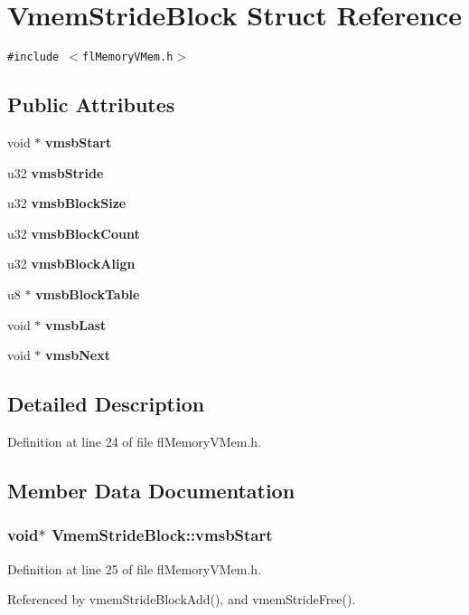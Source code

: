 \section{Vmem\-Stride\-Block Struct Reference}
\label{structVmemStrideBlock}
{\tt \#include $<$fl\-Memory\-VMem.h$>$}

\subsection*{Public Attributes}
\begin{CompactItemize}
\item 
void $\ast$ {\bf vmsb\-Start}
\item 
u32 {\bf vmsb\-Stride}
\item 
u32 {\bf vmsb\-Block\-Size}
\item 
u32 {\bf vmsb\-Block\-Count}
\item 
u32 {\bf vmsb\-Block\-Align}
\item 
u8 $\ast$ {\bf vmsb\-Block\-Table}
\item 
void $\ast$ {\bf vmsb\-Last}
\item 
void $\ast$ {\bf vmsb\-Next}
\end{CompactItemize}


\subsection{Detailed Description}




Definition at line 24 of file fl\-Memory\-VMem.h.

\subsection{Member Data Documentation}
\subsubsection{\setlength{\rightskip}{0pt plus 5cm}void$\ast$ {\bf Vmem\-Stride\-Block::vmsb\-Start}}\label{structVmemStrideBlock_c5035c67d5f9bf0acd8680010522773e}




Definition at line 25 of file fl\-Memory\-VMem.h.

Referenced by vmem\-Stride\-Block\-Add(), and vmem\-Stride\-Free().
